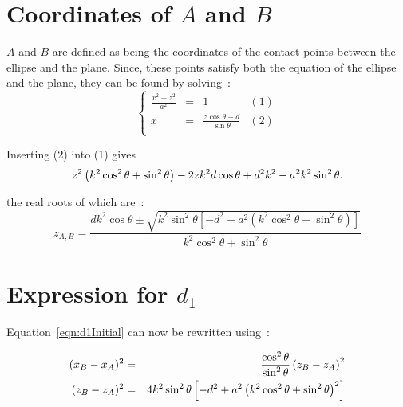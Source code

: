 \section{Coordinates of $A$ and $B$}


$A$ and $B$ are defined as being the coordinates of the contact points between the ellipse and
the plane. Since, these points satisfy both the equation of the ellipse and the plane, they
can be found by solving~:
%
\begin{equation}
	\left\{	%
	\begin{array}{cccc}
		\frac{x^2+z^2}{a^2} &= 	&1					&(1)\\
		x		    &=	&\frac{z\cos\theta - d}{\sin\theta}	&(2)\\
	\end{array}
	\right.
\end{equation}

Inserting (2) into (1) gives
\begin{equation}
	z^2\left( k^2\cos^2\theta + \sin^2\theta \right) - 2zk^2d\cos\theta + d^2k^2 -
	a^2k^2\sin^2\theta.
\end{equation}

the real roots of which are~:
\begin{equation}
	z_{A,B} = \frac{dk^2\cos\theta \pm \sqrt{k^2\sin^2\theta 
	\left[ -d^2 + a^2(k^2\cos^2\theta + \sin^2\theta)\right]}}
	{k^2\cos^2\theta + \sin^2\theta}
\end{equation}


\section{Expression for $d_1$}

Equation~\ref{eqn:d1Initial} can now be rewritten using~:

\begin{eqnarray*}
	(x_B-x_A)^2 &=& \frac{\cos^2\theta}{\sin^2\theta}\left( z_B-z_A \right)^2	\\
	(z_B - z_A)^2 &=& 4k^2\sin^2\theta
	\left[ -d^2 + a^2\left( k^2\cos^2\theta + \sin^2\theta  \right)^2  \right]
\end{eqnarray*}

